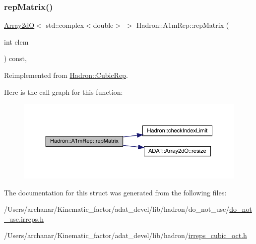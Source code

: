 \subsubsection{\texorpdfstring{repMatrix()}{repMatrix()}\hspace{0.1cm}{\footnotesize\ttfamily [2/2]}}
{\footnotesize\ttfamily \mbox{\hyperlink{classADAT_1_1Array2dO}{Array2dO}}$<$ std\+::complex$<$double$>$ $>$ Hadron\+::\+A1m\+Rep\+::rep\+Matrix (\begin{DoxyParamCaption}\item[{int}]{elem }\end{DoxyParamCaption}) const\hspace{0.3cm}{\ttfamily [inline]}, {\ttfamily [virtual]}}



Reimplemented from \mbox{\hyperlink{structHadron_1_1CubicRep_ac5d7e9e6f4ab1158b5fce3e4ad9e8005}{Hadron\+::\+Cubic\+Rep}}.

Here is the call graph for this function\+:
\nopagebreak
\begin{figure}[H]
\begin{center}
\leavevmode
\includegraphics[width=350pt]{d3/dab/structHadron_1_1A1mRep_aa82be422dc6de780227bb8c42dfeab36_cgraph}
\end{center}
\end{figure}


The documentation for this struct was generated from the following files\+:\begin{DoxyCompactItemize}
\item 
/\+Users/archanar/\+Kinematic\+\_\+factor/adat\+\_\+devel/lib/hadron/do\+\_\+not\+\_\+use/\mbox{\hyperlink{do__not__use_8irreps_8h}{do\+\_\+not\+\_\+use.\+irreps.\+h}}\item 
/\+Users/archanar/\+Kinematic\+\_\+factor/adat\+\_\+devel/lib/hadron/\mbox{\hyperlink{lib_2hadron_2irreps__cubic__oct_8h}{irreps\+\_\+cubic\+\_\+oct.\+h}}\end{DoxyCompactItemize}
